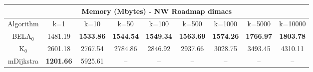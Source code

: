 \begin{tabular}{c|cccccccc}\toprule
\multicolumn{9}{c}{Memory (Mbytes) - NW Roadmap dimacs}\\ \midrule
Algorithm & k=1 & k=10 & k=50 & k=100 & k=500 & k=1000 & k=5000 & k=10000 \\ \midrule
BELA$_0$ & 1481.19 & \textbf{1533.86} & \textbf{1544.54} & \textbf{1549.34} & \textbf{1563.69} & \textbf{1574.26} & \textbf{1766.97} & \textbf{1803.78} \\
K$_0$ & 2601.18 & 2767.54 & 2784.86 & 2846.92 & 2937.66 & 3028.75 & 3493.45 & 4310.11 \\
mDijkstra & \textbf{1201.66} & 5925.61 & -- & -- & -- & -- & -- & -- \\ \bottomrule 
\end{tabular}
